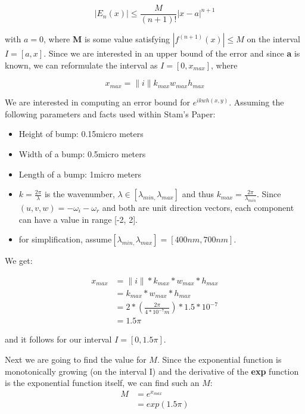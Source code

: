\begin{equation}
 |E_{n}(x)|\leq\frac{M}{(n+1)!}|x-a|^{n+1} 
\end{equation}

with $a=0$, where \textbf{M} is some value satisfying $|f^{(n+1)}(x)|\leq M$ on the interval $I=[a,x]$. Since we are interested in an upper bound of the error and since \textbf{a} is known, we can reformulate the interval as $I=[0,x_{max}]$, where 

\begin{equation}
 x_{max} = \|i\| k_{max} w_{max} h_{max}
\end{equation}

We are interested in computing an error bound for $e^{ikwh(x,y)}$. Assuming the following parameters and facts used within Stam's Paper: 

\begin{itemize}
\item Height of bump: 0.15micro meters
\item Width of a bump: 0.5micro meters
\item Length of a bump: 1micro meters
\item $k=\frac{2\pi}{\lambda}$ is the wavenumber, $\lambda\in[\lambda_{min,}\lambda_{max}]$ and
thus $k_{max}=\frac{2\pi}{\lambda_{min}}$. Since $(u,v,w) = -\omega_i - \omega_r$ and both are unit direction vectors, 
each component can have a value in range {[}-2, 2{]}.
\item for simplification, assume$[\lambda_{min,}\lambda_{max}]=[400nm,700nm].$

\end{itemize}

We get:  

\begin{align}
x_{max}
 &= \|i\|*k_{max}*w_{max}*h_{max} \nonumber \\
 &= k_{max}*w_{max}*h_{max} \nonumber \\
 &=2*(\frac{2\pi}{4*10^{-7}m})*1.5*10^{-7} \nonumber \\
 &=1.5\pi
\end{align}

and it follows for our interval $I=[0,1.5\pi]$. 

Next we are going to find the value for $M$. Since the exponential function is monotonically growing (on the interval I) and the derivative of the \textbf{exp} function is the exponential function itself, we can find such an $M$: 
\begin{align*}
 M
 &=e^{x_{max}} \nonumber \\
 &=exp(1.5\pi)
\end{align*}

